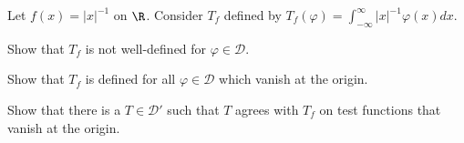Let $f(x)=|x|^{-1}$ on $\R$. Consider $T_f$ defined by
$T_f(\varphi)=\int_{-\infty}^{\infty}|x|^{-1}\varphi(x)dx$.
\begin{alist}
\item Show that $T_f$ is not well-defined for $\varphi\in
\mathcal{D}$.
\item Show that $T_f$ is defined for all $\varphi\in \mathcal{D}$
which vanish at the origin.
\item Show that there is a $T\in \mathcal{D}'$ such that $T$ agrees
with $T_f$ on test functions that vanish at the origin.
\end{alist}
